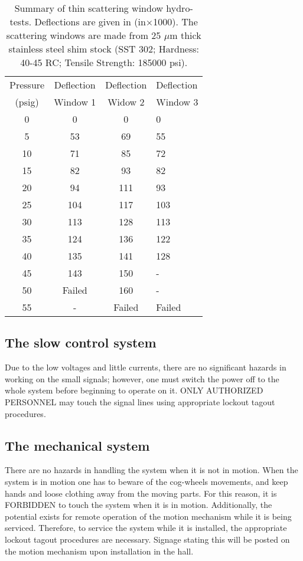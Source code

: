 %
\begin{table}
\begin{center}\begin{tabular}{|c|c|c|p{2in}|}
\hline 
Pressure&
\multicolumn{1}{c|}{Deflection}&
\multicolumn{1}{c|}{Deflection}&
\multicolumn{1}{p{2in}|}{Deflection}\\
(psig)&
\multicolumn{1}{c|}{Window 1}&
Widow 2&
Window 3\\
\hline
\hline 
0&
0&
0&
0\\
\hline
5&
53&
69&
55\\
\hline
10&
71&
85&
72\\
\hline
15&
82&
93&
82\\
\hline
20&
94&
111&
93\\
\hline
25&
104&
117&
103\\
\hline
30&
113&
128&
113\\
\hline
35&
124&
136&
122\\
\hline
40&
135&
141&
128\\
\hline
45&
143&
150&
-\\
\hline
50&
Failed&
160&
-\\
\hline
55&
-&
Failed&
Failed\\
\hline
\end{tabular}\end{center}


\caption{Summary of thin scattering window hydro-tests. Deflections are given
in (in$\times $1000). The scattering windows are made from 25 $\mu $m
thick stainless steel shim stock (SST 302; Hardness: 40-45 RC; Tensile
Strength: 185000 psi). \label{tab: window-table}}
\end{table}



\subsection{The slow control system}

Due to the low voltages and little currents, there are no significant
hazards in working on the small signals; however, one must switch
the power off to the whole system before beginning to operate on it.
ONLY AUTHORIZED PERSONNEL may touch the signal lines using appropriate
lockout tagout procedures.


\subsection{The mechanical system}

There are no hazards in handling the system when it is not in motion.
When the system is in motion one has to beware of the cog-wheels movements,
and keep hands and loose clothing away from the moving parts. For
this reason, it is FORBIDDEN to touch the system when it is in motion.
Additionally, the potential exists for remote operation of the motion
mechanism while it is being serviced. Therefore, to service the system
while it is installed, the appropriate lockout tagout procedures are
necessary. Signage stating this will be posted on the motion mechanism
upon installation in the hall.


